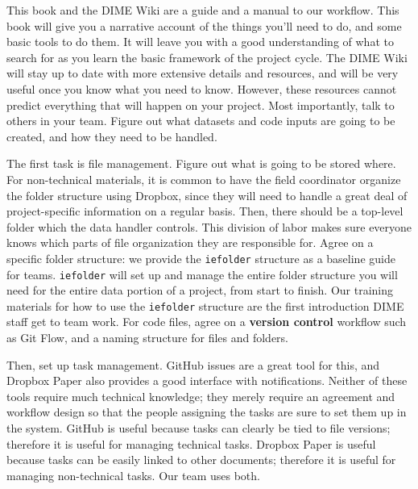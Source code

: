This book and the DIME Wiki
are a guide and a manual to our workflow.
This book will give you a narrative account of the things you'll need to do,
and some basic tools to do them.
It will leave you with a good understanding of what to search for
as you learn the basic framework of the project cycle.
The DIME Wiki will stay up to date with more extensive details and resources,
and will be very useful once you know what you need to know.
However, these resources cannot predict everything that will happen on your project.
Most importantly, talk to others in your team.
Figure out what datasets and code inputs are going to be created,
and how they need to be handled.

The first task is file management.
Figure out what is going to be stored where.
For non-technical materials,
it is common to have the field coordinator organize
the folder structure using Dropbox,
since they will need to handle a great deal of
project-specific information on a regular basis.
Then, there should be a top-level folder which the data handler controls.
This division of labor makes sure everyone knows
which parts of file organization they are responsible for.
Agree on a specific folder structure: we provide the
\texttt{iefolder}
structure as a baseline guide for teams.
\texttt{iefolder} will set up and manage the entire folder structure
you will need for the entire data portion of a project, from start to finish.
Our training materials for how to use the \texttt{iefolder} structure
are the first introduction DIME staff get to team work.
For code files, agree on a \textbf{version control}\cite{blischak2016quick} workflow such as
Git Flow,
and a naming structure for files and folders.

Then, set up task management. GitHub issues are a great tool for this,
and Dropbox Paper also provides a good interface with notifications.
Neither of these tools require much technical knowledge;
they merely require an agreement and workflow design
so that the people assigning the tasks
are sure to set them up in the system.
GitHub is useful because tasks can clearly be tied to file versions;
therefore it is useful for managing technical tasks.
Dropbox Paper is useful because tasks can be easily linked to other documents;
therefore it is useful for managing non-technical tasks.
Our team uses both.
